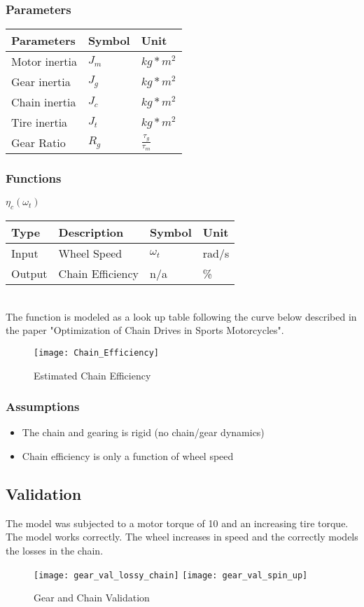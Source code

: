\documentclass[../SimBALink.tex]{subfiles}
\begin{document}
\subsubsection{Parameters}
	\begin{tabular}{ l | l | l  }
		Parameters					&	Symbol		&	Unit		\\	\hline
		Motor inertia		&	$J_m$		&	 $kg*m^2$ \\ 
		Gear inertia		&	$J_g$		&	 $kg*m^2$ \\ 
		Chain inertia		&	$J_c$		&	 $kg*m^2$ \\ 
		Tire inertia		&	$J_t$		&	 $kg*m^2$ \\ 
		Gear Ratio			&	$R_g$		&	$\frac{\tau_g}{\tau_m}$
	\end{tabular}
	
\subsubsection{Functions}
$\eta_c(\omega_t)$ \\
	\begin{tabular}{ l | l | l | l }
		Type				& Description		&	Symbol		&	Unit		\\	\hline
		Input 				& Wheel Speed		&	$\omega_t$  & 	rad/s		\\
		Output 				& Chain Efficiency	&	n/a			&	\%
	\end{tabular} \\

The function is modeled as a look up table following the curve below described in the paper "Optimization of Chain Drives in Sports Motorcycles".

\begin{figure}[h!]
  \centering
  \texttt{[image: Chain\_Efficiency]}
  \caption{Estimated Chain Efficiency}
\end{figure}

\subsubsection{Assumptions}
\begin{itemize}
  \item The chain and gearing is rigid (no chain/gear dynamics)
  \item Chain efficiency is only a function of wheel speed
\end{itemize}

\subsection{Validation}

The model was subjected to a motor torque of 10 and an increasing tire torque. The model works correctly. The wheel increases in speed and the correctly models the losses in the chain.


\begin{figure}[H]
\center
  \texttt{[image: gear\_val\_lossy\_chain]}
  \texttt{[image: gear\_val\_spin\_up]}
  \caption{Gear and Chain Validation}
\end{figure}
\end{document}
